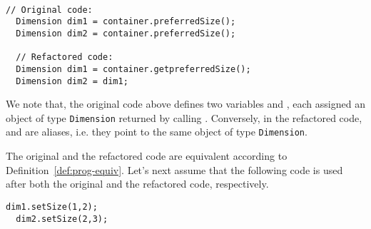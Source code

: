 \documentclass[sigconf,review,anonymous]{acmart}
\begin{document}
\begin{example}\label{ex:aliasing}
~\begin{lstlisting}[mathescape=true,showstringspaces=false]
  // Original code:
  Dimension dim1 = container.preferredSize();
  Dimension dim2 = container.preferredSize();    

  // Refactored code:
  Dimension dim1 = container.getpreferredSize();  
  Dimension dim2 = dim1;
\end{lstlisting}



    




We note that, the original code above defines two variables  and
, each assigned an object of type \texttt{Dimension} returned by calling
.
Conversely, in the refactored code,  and  are aliases, i.e. they point to the same
object of type \texttt{Dimension}.

The original and the refactored code are equivalent according to Definition~\ref{def:prog-equiv}.
Let's next assume that the following code
is used after both the original and the refactored code, respectively.

\begin{lstlisting}[mathescape=true,showstringspaces=false]
  dim1.setSize(1,2);
  dim2.setSize(2,3);  
\end{lstlisting}


\end{example}
\end{document}
